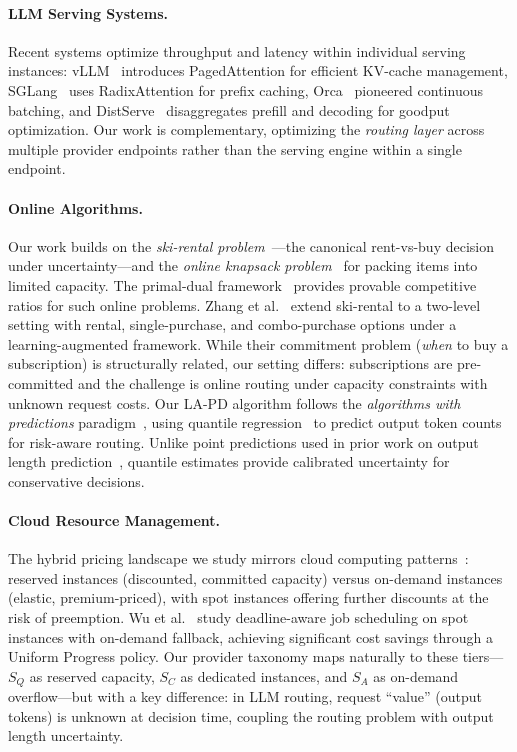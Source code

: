 \paragraph{LLM Serving Systems.}
Recent systems optimize throughput and latency within individual serving instances: vLLM~\cite{vllm_pagedattention} introduces PagedAttention for efficient KV-cache management, SGLang~\cite{sglang_radixattention} uses RadixAttention for prefix caching, Orca~\cite{orca_osdi22} pioneered continuous batching, and DistServe~\cite{distserve_osdi24} disaggregates prefill and decoding for goodput optimization.
Our work is complementary, optimizing the \textit{routing layer} across multiple provider endpoints rather than the serving engine within a single endpoint.

\paragraph{Online Algorithms.}
Our work builds on the \textit{ski-rental problem}~\cite{karlin_ski_rental_algorithmica94}---the canonical rent-vs-buy decision under uncertainty---and the \textit{online knapsack problem}~\cite{han_online_knapsack_tcs15} for packing items into limited capacity.
The primal-dual framework~\cite{buchbinder_naor_pd_survey} provides provable competitive ratios for such online problems.
Zhang et al.~\cite{zhang2024learningaugmentedonlinealgorithmtwolevel} extend ski-rental to a two-level setting with rental, single-purchase, and combo-purchase options under a learning-augmented framework.
While their commitment problem (\textit{when} to buy a subscription) is structurally related, our setting differs: subscriptions are pre-committed and the challenge is online routing under capacity constraints with unknown request costs.
Our LA-PD algorithm follows the \textit{algorithms with predictions} paradigm~\cite{mitzenmacher_vassilvitskii_cacm22}, using quantile regression~\cite{koenker_bassett_regression_quantiles} to predict output token counts for risk-aware routing.
Unlike point predictions used in prior work on output length prediction~\cite{qiu_proxy_length_pred}, quantile estimates provide calibrated uncertainty for conservative decisions.

\paragraph{Cloud Resource Management.}
The hybrid pricing landscape we study mirrors cloud computing patterns~\cite{aws_reserved,aws_ondemand}: reserved instances (discounted, committed capacity) versus on-demand instances (elastic, premium-priced), with spot instances offering further discounts at the risk of preemption.
Wu et al.~\cite{DBLP:conf/nsdi/WuCMYFSS24} study deadline-aware job scheduling on spot instances with on-demand fallback, achieving significant cost savings through a Uniform Progress policy.
Our provider taxonomy maps naturally to these tiers---$S_Q$ as reserved capacity, $S_C$ as dedicated instances, and $S_A$ as on-demand overflow---but with a key difference: in LLM routing, request ``value'' (output tokens) is unknown at decision time, coupling the routing problem with output length uncertainty.
